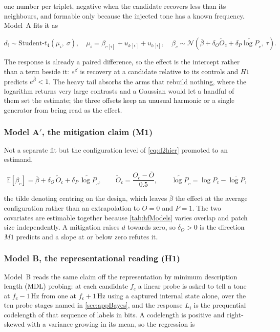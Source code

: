 one number per triplet, negative when the candidate recovers less than its neighbours, and formable only because the injected tone has a known frequency. Model~A fits it as

\begin{equation}
\label{eq:d2hier}
d_i \sim \text{Student-}t_4(\mu_i,\ \sigma),
\quad
\mu_i = \beta_{c[i]} + u_{k[i]} + u_{b[i]},
\quad
\beta_c \sim \mathcal{N}\!\left(\bar\beta + \delta_O \widetilde O_c + \delta_P \widetilde{\log P}_c,\ \tau\right).
\end{equation}

The response is already a paired difference, so the effect is the intercept rather than a term beside it: $e^{\bar\beta}$ is recovery at a candidate relative to its controls and $H1$ predicts $e^{\bar\beta}<1$. The heavy tail absorbs the arms that rebuild nothing, where the logarithm returns very large contrasts and a Gaussian would let a handful of them set the estimate; the three offsets keep an unusual harmonic or a single generator from being read as the effect.

\subsubsection*{Model A$'$, the mitigation claim (M1)}
Not a separate fit but the configuration level of \autoref{eq:d2hier} promoted to an estimand,

\begin{equation}
\label{eq:d2mitigation}
\mathbb{E}\!\left[\beta_c\right] = \bar\beta + \delta_O\,\widetilde O_c + \delta_P\,\widetilde{\log P}_c,
\qquad
\widetilde O_c=\frac{O_c-\bar O}{0.5},
\qquad
\widetilde{\log P}_c=\log P_c-\overline{\log P},
\end{equation}

the tilde denoting centring on the design, which leaves $\bar\beta$ the effect at the average configuration rather than an extrapolation to $O=0$ and $P=1$. The two covariates are estimable together because \autoref{tab:hfModels} varies overlap and patch size independently. A mitigation raises $d$ towards zero, so $\delta_O>0$ is the direction $M1$ predicts and a slope at or below zero refutes it.

\subsubsection*{Model B, the representational reading (H1)}
Model~B reads the same claim off the representation by minimum description length (MDL) probing\autocite{voitaInformationTheoreticProbingMinimum2020}: at each candidate $f_c$ a linear probe is asked to tell a tone at $f_c-1$\,Hz from one at $f_c+1$\,Hz using a captured internal state alone, over the ten probe stages named in \autoref{sec:appBayes}, and the response $L_i$ is the prequential codelength of that sequence of labels in bits. A codelength is positive and right-skewed with a variance growing in its mean, so the regression is

